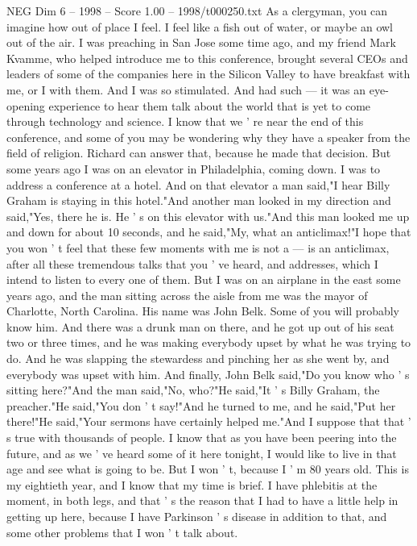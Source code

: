 \begin{textsample}{NEG Dim 6 – 1998 – Score 1.00 – 1998/t000250.txt}  \label{ex:f6_neg_064}
As a clergyman, you can imagine how out of place I feel.
I feel like a fish out of water, or maybe an owl out of the air.
I was preaching in San Jose some time ago, and my friend Mark Kvamme, who helped introduce me to this conference, brought several CEOs and leaders of some of the companies here in the Silicon Valley to have breakfast with me, or I with them.
And I was so stimulated.
And had such — it was an eye-opening experience to hear them talk about the world that is yet to come through technology and science.
I know that we ' re near the end of this conference, and some of you may be wondering why they have a speaker from the field of religion.
Richard can answer that, because he made that decision.
But some years ago I was on an elevator in Philadelphia, coming down.
I was to address a conference at a hotel.
And on that elevator a man said,"I hear Billy Graham is staying in this hotel."And another man looked in my direction and said,"Yes, there he is.
He ' s on this elevator with us."And this man looked me up and down for about 10 seconds, and he said,"My, what an anticlimax!"I hope that you won ' t feel that these few moments with me is not a — is an anticlimax, after all these tremendous talks that you ' ve heard, and addresses, which I intend to listen to every one of them.
But I was on an airplane in the east some years ago, and the man sitting across the aisle from me was the mayor of Charlotte, North Carolina.
His name was John Belk.
Some of you will probably know him.
And there was a drunk man on there, and he got up out of his seat two or three times, and he was making everybody upset by what he was trying to do.
And he was slapping the stewardess and pinching her as she went by, and everybody was upset with him.
And finally, John Belk said,"Do you know who ' s sitting here?"And the man said,"No, who?"He said,"It ' s Billy Graham, the preacher."He said,"You don ' t say!"And he turned to me, and he said,"Put her there!"He said,"Your sermons have certainly helped me."And I suppose that that ' s true with thousands of people.
I know that as you have been peering into the future, and as we ' ve heard some of it here tonight, I would like to live in that age and see what is going to be.
But I won ' t, because I ' m 80 years old.
This is my eightieth year, and I know that my time is brief.
I have phlebitis at the moment, in both legs, and that ' s the reason that I had to have a little help in getting up here, because I have Parkinson ' s disease in addition to that, and some other problems that I won ' t talk about.

\end{textsample}
